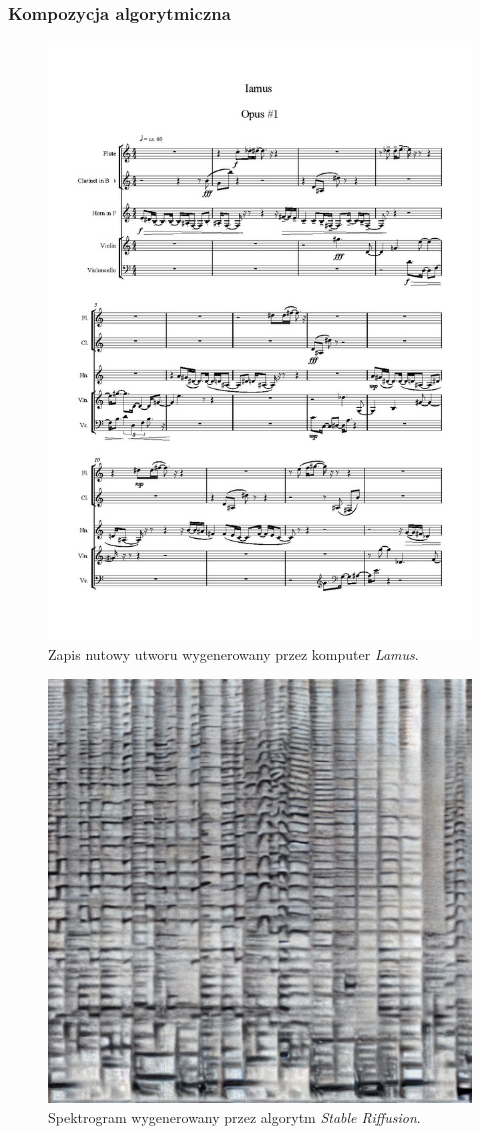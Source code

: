 \documentclass[]{beamer}
\begin{document}
\begin{frame}
  \frametitle{Kompozycja algorytmiczna}

  \begin{multicols}{2}
  \begin{figure}
    \includegraphics[width=0.7\linewidth]{lamus_notes.jpg}
    \caption{Zapis nutowy utworu wygenerowany przez komputer \textit{Lamus}.}
  \end{figure}

  \begin{figure}
    \includegraphics[width=0.8\linewidth]{riffusion_spectro.jpg}
    \caption{Spektrogram wygenerowany przez algorytm \textit{Stable Riffusion}.}
  \end{figure}
  \end{multicols}

\end{frame}
\end{document}
